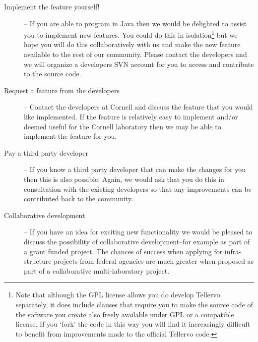 \begin{description}
 \item[Implement the feature yourself!] -- If you are able to program in Java then we would be delighted to assist you to implement new features.  You could do this in isolation\footnote{Note that although the GPL license allows you do develop Tellervo separately, it does include clauses that require you to make the source code of the software you create also freely available under GPL or a compatible license. If you `fork' the code in this way you will find it increasingly difficult to benefit from improvements made to the official Tellervo code.} but we hope you will do this collaboratively with us and make the new feature available to the rest of our community.  Please contact the developers and we will organize a developers SVN account for you to access and contribute to the source code.
 \item[Request a feature from the developers] -- Contact the developers at Cornell and discuss the feature that you would like implemented.  If the feature is relatively easy to implement and/or deemed useful for the Cornell laboratory then we may be able to implement the feature for you.
 \item[Pay a third party developer] -- If you know a third party developer that can make the changes for you then this is also possible.  Again, we would ask that you do this in consultation with the existing developers so that any improvements can be contributed back to the community.
 \item[Collaborative development] -- If you have an idea for exciting new functionality we would be pleased to discuss the possibility of collaborative development--for example as part of a grant funded project.  The chances of success when applying for infra-structure projects from federal agencies are much greater when proposed as part of a collaborative multi-laboratory project.
\end{description}


